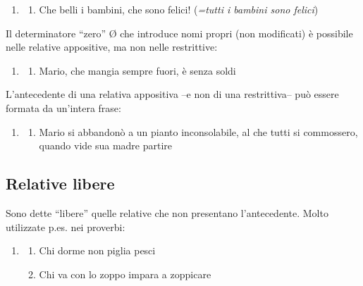 \documentclass[
  a4paper,
  twoside,
  11pt,
  chapterprefix=false,
  bibliography=totocnumbered,
  listof=flat]{scrbook}
\providecommand{\tightlist}{%
  \setlength{\itemsep}{0pt}\setlength{\parskip}{0pt}}
\begin{document}
\begin{enumerate}
\def\labelenumi{(\arabic{enumi})}
\setcounter{enumi}{138}
\item
  \begin{enumerate}
  \def\labelenumii{\alph{enumii}.}
  \tightlist
  \item
    Che belli i bambini, che sono felici! (\emph{=tutti i bambini sono felici})
  \end{enumerate}
\end{enumerate}

Il determinatore \enquote{zero} Ø che introduce nomi propri (non modificati) è possibile nelle relative appositive, ma non nelle restrittive:

\begin{enumerate}
\def\labelenumi{(\arabic{enumi})}
\setcounter{enumi}{139}
\item
  \begin{enumerate}
  \def\labelenumii{\alph{enumii}.}
  \tightlist
  \item
    Mario, che mangia sempre fuori, è senza soldi
  \end{enumerate}
\end{enumerate}

L'antecedente di una relativa appositiva --e non di una restrittiva-- può essere formata da un'intera frase:

\begin{enumerate}
\def\labelenumi{(\arabic{enumi})}
\setcounter{enumi}{140}
\item
  \begin{enumerate}
  \def\labelenumii{\alph{enumii}.}
  \tightlist
  \item
    Mario si abbandonò a un pianto inconsolabile, al che tutti si commossero, quando vide sua madre partire
  \end{enumerate}
\end{enumerate}

\hypertarget{relative-libere}{%
\subsection{Relative libere}\label{relative-libere}}

Sono dette \enquote{libere} quelle relative che non presentano l'antecedente. Molto utilizzate p.es. nei proverbi:

\begin{enumerate}
\def\labelenumi{(\arabic{enumi})}
\setcounter{enumi}{141}
\item
  \begin{enumerate}
  \def\labelenumii{\alph{enumii}.}
  \tightlist
  \item
    Chi dorme non piglia pesci
  \item
    Chi va con lo zoppo impara a zoppicare
  \end{enumerate}
\end{enumerate}
\end{document}
